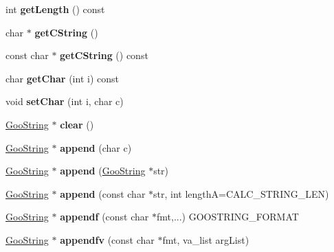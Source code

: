 \begin{DoxyCompactItemize}
int {\bfseries get\+Length} () const
\item 
\mbox{\label{class_goo_string_a7303368e49b8ecc88704878fbb458557}} 
char $\ast$ {\bfseries get\+C\+String} ()
\item 
\mbox{\label{class_goo_string_ada6232616503449c6f5d65a571e05fbc}} 
const char $\ast$ {\bfseries get\+C\+String} () const
\item 
\mbox{\label{class_goo_string_a1382315118ebaa9ea1ea2a0fd18e1bb7}} 
char {\bfseries get\+Char} (int i) const
\item 
\mbox{\label{class_goo_string_a8db9b10aa2972a51d52154e75b1bb827}} 
void {\bfseries set\+Char} (int i, char c)
\item 
\mbox{\label{class_goo_string_aa1ac1a67d41801efe8a97b4d85e1e4ef}} 
\hyperlink{class_goo_string}{Goo\+String} $\ast$ {\bfseries clear} ()
\item 
\mbox{\label{class_goo_string_a96866f4adff19ec437d36fffdfa8abe4}} 
\hyperlink{class_goo_string}{Goo\+String} $\ast$ {\bfseries append} (char c)
\item 
\mbox{\label{class_goo_string_a91bd774898498d524a24e1dcf8529f29}} 
\hyperlink{class_goo_string}{Goo\+String} $\ast$ {\bfseries append} (\hyperlink{class_goo_string}{Goo\+String} $\ast$str)
\item 
\mbox{\label{class_goo_string_a84de8f72d5778e34a3cb8bbd34a2029f}} 
\hyperlink{class_goo_string}{Goo\+String} $\ast$ {\bfseries append} (const char $\ast$str, int lengthA=C\+A\+L\+C\+\_\+\+S\+T\+R\+I\+N\+G\+\_\+\+L\+EN)
\item 
\mbox{\label{class_goo_string_abcb95888daa48bda34a4648334daa646}} 
\hyperlink{class_goo_string}{Goo\+String} $\ast$ {\bfseries appendf} (const char $\ast$fmt,...) G\+O\+O\+S\+T\+R\+I\+N\+G\+\_\+\+F\+O\+R\+M\+AT
\item 
\mbox{\label{class_goo_string_aeee092e62fc8d321945f98a9ab213f70}} 
\hyperlink{class_goo_string}{Goo\+String} $\ast$ {\bfseries appendfv} (const char $\ast$fmt, va\+\_\+list arg\+List)

\end{DoxyCompactItemize}
